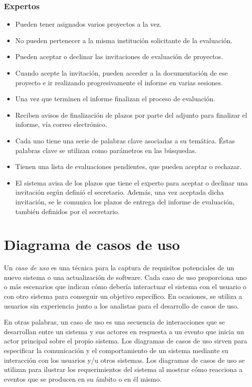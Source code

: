 \documentclass[11pt,a4paper,spanish,twoside]{book}
\begin{document}
\subsection{Expertos}
\begin{itemize}
\item Pueden tener asignados varios proyectos a la vez. 
\item No pueden pertenecer a la misma institución solicitante de la evaluación.
\item Pueden aceptar o declinar las invitaciones de evaluación de proyectos.
\item Cuando acepte la invitación, pueden acceder a la documentación de ese
  proyecto e ir realizando progresivamente el informe en varias sesiones. 
\item Una vez que terminen el informe finalizan el proceso de evaluación.
\item Reciben avisos de finalización de plazos por parte del adjunto para
  finalizar el informe, vía correo electrónico.
\item Cada uno tiene una serie de palabras clave asociadas a su
  temática. Éstas palabras clave se utilizan como parámetros en las
  búsquedas. 
\item Tienen una lista de evaluaciones pendientes, que pueden aceptar o 
  rechazar.
\item El sistema avisa de los plazos que tiene el experto para aceptar o
  declinar una invitación según definió el secretario. Además, una vez
  aceptada dicha invitación, se le comunica los plazos de entrega del informe
  de evaluación, también definidos por el secretario.   

\end{itemize}

\chapter{Diagrama de casos de uso}
Un \emph{caso de uso} es una técnica para la captura de requisitos
potenciales de un nuevo sistema o una actualización de software. Cada caso de
uso proporciona uno o más escenarios que indican cómo debería interactuar el
sistema con el usuario o con otro sistema para conseguir un objetivo
específico. En ocasiones, se utiliza a usuarios sin experiencia junto a los
analistas para el desarrollo de casos de uso.

En otras palabras, un caso de uso es una secuencia de interacciones que se
desarrollan entre un sistema y sus actores en respuesta a un evento que
inicia un actor principal sobre el propio sistema. Los diagramas de casos de
uso sirven para especificar la comunicación y el comportamiento de un sistema
mediante su interacción con los usuarios y/u otros sistemas. Los diagramas de
casos de uso se utilizan para ilustrar los requerimientos del sistema al
mostrar cómo reacciona a eventos que se producen en su ámbito o en él mismo.
\end{document}
